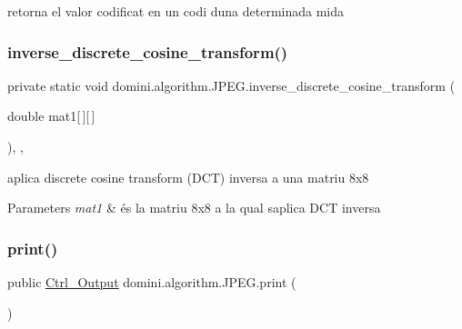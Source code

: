 retorna el valor codificat en un codi d\textquotesingle{}una determinada mida 

\mbox{\label{classdomini_1_1algorithm_1_1JPEG_a3a6e16b0ee34746e4b0118ed9107bd75}} 
\subsubsection{\texorpdfstring{inverse\+\_\+discrete\+\_\+cosine\+\_\+transform()}{inverse\_discrete\_cosine\_transform()}}
{\footnotesize\ttfamily private static void domini.\+algorithm.\+J\+P\+E\+G.\+inverse\+\_\+discrete\+\_\+cosine\+\_\+transform (\begin{DoxyParamCaption}\item[{double}]{mat1\mbox{[}$\,$\mbox{]}\mbox{[}$\,$\mbox{]} }\end{DoxyParamCaption})\hspace{0.3cm}{\ttfamily [inline]}, {\ttfamily [static]}, {\ttfamily [private]}}



aplica discrete cosine transform (D\+CT) inversa a una matriu 8x8 


\begin{DoxyParams}{Parameters}
{\em mat1} & és la matriu 8x8 a la qual s\textquotesingle{}aplica D\+CT inversa \\
\hline
\end{DoxyParams}
\mbox{\label{classdomini_1_1algorithm_1_1JPEG_a02fa1a8d05204b71cf6d5e8d6bbd3d2b}} 
\subsubsection{\texorpdfstring{print()}{print()}}
{\footnotesize\ttfamily public \hyperlink{classpersistencia_1_1output_1_1Ctrl__Output}{Ctrl\+\_\+\+Output} domini.\+algorithm.\+J\+P\+E\+G.\+print (\begin{DoxyParamCaption}{ }\end{DoxyParamCaption})\hspace{0.3cm}{\ttfamily [inline]}}




